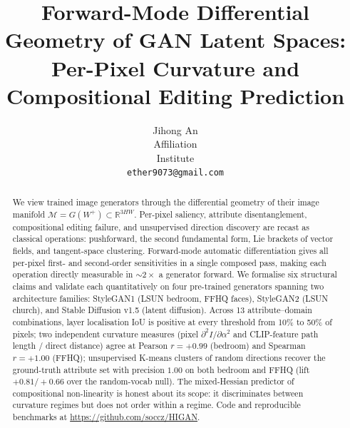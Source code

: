 \documentclass[10pt,twocolumn,letterpaper]{article}
\newcommand{\R}{\mathbb{R}}
\newcommand{\W}{W^+}
\newcommand{\Mfd}{\mathcal{M}}
\begin{document}
\title{Forward-Mode Differential Geometry of GAN Latent Spaces:\\
       Per-Pixel Curvature and Compositional Editing Prediction}

\author{Jihong An\\
Affiliation\\
Institute\\
{\tt\small ether9073@gmail.com}
}

\maketitle
\thispagestyle{empty}

\begin{abstract}
We view trained image generators through the differential geometry of their
image manifold $\Mfd = G(\W) \subset \R^{3HW}$. Per-pixel saliency,
attribute disentanglement, compositional editing failure, and unsupervised
direction discovery are recast as classical operations: pushforward, the
second fundamental form, Lie brackets of vector fields, and tangent-space
clustering. Forward-mode automatic differentiation gives all per-pixel
first- and second-order sensitivities in a single composed pass, making
each operation directly measurable in $\sim 2 \times$ a generator forward.
We formalise six structural claims and validate each quantitatively on
four pre-trained generators spanning two architecture families: StyleGAN1
(LSUN bedroom, FFHQ faces), StyleGAN2 (LSUN church), and Stable Diffusion
v1.5 (latent diffusion). Across 13 attribute--domain combinations, layer
localisation IoU is positive at every threshold from 10\% to 50\% of
pixels; two independent curvature measures (pixel
$\partial^2 I/\partial\alpha^2$ and CLIP-feature path length / direct
distance) agree at Pearson $r=+0.99$ (bedroom) and Spearman $r=+1.00$
(FFHQ); unsupervised K-means clusters of random directions recover the
ground-truth attribute set with precision $1.00$ on both bedroom and FFHQ
(lift $+0.81 / +0.66$ over the random-vocab null). The mixed-Hessian
predictor of compositional non-linearity is honest about its scope: it
discriminates between curvature regimes but does not order within a
regime. Code and reproducible benchmarks at
\url{https://github.com/soccz/HIGAN}.
\end{abstract}
\end{document}

